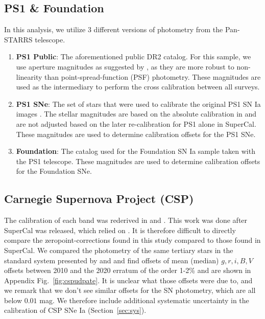 \documentclass[twocolumn]{aastex63}
\newcommand{\blue}{\color{black}}
\begin{document}
\subsection{PS1 \& Foundation}
{\blue In this analysis, we utilize 3 different versions of photometry from the Pan-STARRS telescope. 
\begin{enumerate}
    \item \textbf{PS1 Public}: The aforementioned public DR2 catalog. For this sample, we use aperture magnitudes as suggested by \cite{Currie20}, as they are more robust to non-linearity than point-spread-function (PSF) photometry. {These magnitudes are used as the intermediary to perform the cross calibration between all surveys.}
    
    \item \textbf{PS1 SNe}: The set of stars that were used to calibrate the original PS1 SN Ia images \citep{Rest14,Scolnic13}.  The stellar magnitudes are based on the absolute calibration in \cite{Tonry12} and are not adjusted based on the later re-calibration for PS1 alone in SuperCal. {These magnitudes are used to determine calibration offsets for the PS1 SNe.}
    
    \item \textbf{Foundation}: The catalog used for the Foundation SN Ia sample \citep{Foley2018} taken with the PS1 telescope. {These magnitudes are used to determine calibration offsets for the Foundation SNe.}
\end{enumerate}
}

\subsection{Carnegie Supernova Project (CSP)}
The calibration of each band was rederived in \cite{krisciunis17} and \cite{krisciunas20}. This work was done after SuperCal was released, which relied on \cite{Stritzinger2010}.  It is therefore difficult to directly compare the zeropoint-corrections found in this study compared to those found in SuperCal. {\blue We compared the photometry of the same tertiary stars in the standard system presented by \cite{Stritzinger2010} and \cite{krisciunas20} and find offsets of mean (median) $g,r,i,B,V$ offsets between 2010 and the 2020 erratum of the order 1-2\% and are shown in Appendix Fig.~\ref{fig:cspudpate}. It is unclear what those offsets were due to, and we remark that we don’t see similar offsets for the SN photometry, which are all below $0.01$ mag. We therefore include additional systematic uncertainty in the calibration of CSP SNe Ia (Section~\ref{sec:sys}).}
\end{document}
